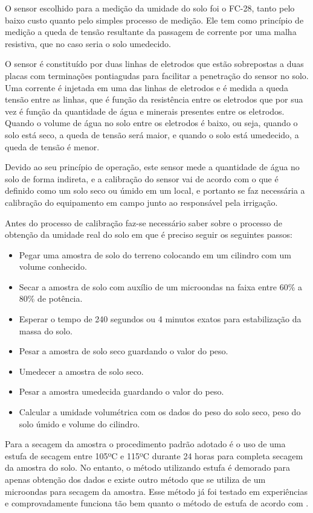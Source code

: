   O sensor escolhido para a medição da umidade do solo foi o FC-28,
  tanto pelo baixo custo quanto pelo simples processo de medição.
  Ele tem como princípio de medição a queda de tensão resultante da
  passagem de corrente por uma malha resistiva, que no caso seria o solo
  umedecido.

  O sensor é constituído por duas linhas de eletrodos que estão
  sobrepostas a duas placas com terminações pontiagudas para facilitar a
  penetração do sensor no solo. Uma corrente é injetada em uma das linhas
  de eletrodos e é medida a queda tensão entre as linhas, que é função da
  resistência entre os eletrodos que por sua vez é função da quantidade de
  água e minerais presentes entre os eletrodos. Quando o volume de água no
   solo entre os eletrodos é baixo, ou seja, quando o solo está seco,
   a queda de tensão será maior, e quando o solo está umedecido,
   a queda de tensão é menor.

  Devido ao seu princípio de operação, este sensor mede a quantidade de
  água no solo de forma indireta, e a calibração do sensor vai de acordo
  com o que é definido como um solo seco ou úmido em um local, e portanto
  se faz necessária a calibração do equipamento em campo junto ao
  responsável pela irrigação.
  
  Antes do processo de calibração faz-se necessário saber sobre o processo de obtenção da umidade real do solo em que é preciso seguir os seguintes passos:
  
  \begin{itemize}
  	\item Pegar uma amostra de solo do terreno colocando em um cilindro com um volume conhecido.
  	\item Secar a amostra de solo com auxílio de um microondas na faixa entre 60\% a 80\% de potência.
  	\item Esperar o tempo de 240 segundos ou 4 minutos exatos para estabilização da massa do solo.
  	\item Pesar a amostra de solo seco guardando o valor do peso.
  	\item Umedecer a amostra de solo seco.
  	\item Pesar a amostra umedecida guardando o valor do peso.
  	\item Calcular a umidade volumétrica com os dados do peso do solo seco, peso do solo úmido e volume do cilindro.
  \end{itemize}
  
  Para a secagem da amostra o procedimento padrão adotado é o uso de uma estufa de secagem entre 105ºC e 115ºC durante 24 horas para completa secagem da amostra do solo. No entanto, o método utilizando estufa é demorado para apenas obtenção dos dados e existe outro método que se utiliza de um microondas para secagem da amostra. Esse método já foi testado em experiências e comprovadamente funciona tão bem quanto o método de estufa de acordo com .
  
